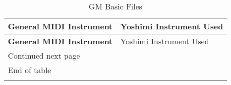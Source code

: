 %
%
%

   \label{table:gm_basic_files}
   \begin{longtable}{|l l|}

   \caption{GM Basic Files} \\

   \hline
      \textbf{General MIDI Instrument} &
         Yoshimi Instrument Used \\
   \hline
   \endfirsthead

   \hline
      \textbf{General MIDI Instrument} &
         Yoshimi Instrument Used \\
   \hline
   \endhead

   \hline
      Continued next page & \\
   \hline
   \endfoot

   \hline
      End of table & \\
   \hline
   \endlastfoot


\end{longtable}
